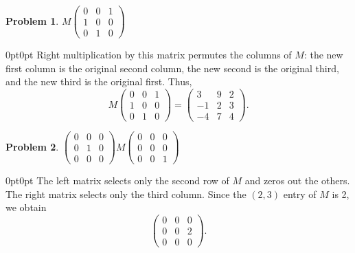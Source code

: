 \documentclass[12pt]{article}
\newenvironment{answer}
    {\begin{adjustwidth}{0pt}{0pt}}
    {\end{adjustwidth}}
\newtheorem{problem}{Problem}
\theoremstyle{remark}  %
\begin{document}
\begin{problem}
$
M
\begin{pmatrix}
0 & 0 & 1 \\
1 & 0 & 0 \\
0 & 1 & 0
\end{pmatrix}
$
\end{problem}
\begin{answer}
Right multiplication by this matrix permutes the columns of \(M\): the new first column is the original second column, the new second is the original third, and the new third is the original first. Thus,
\[
M \begin{pmatrix}
0 & 0 & 1 \\
1 & 0 & 0 \\
0 & 1 & 0
\end{pmatrix}
=
\begin{pmatrix}
3 & 9 & 2 \\
-1 & 2 & 3 \\
-4 & 7 & 4
\end{pmatrix}.
\]
\end{answer}

\begin{problem}
$
\begin{pmatrix}
0 & 0 & 0 \\
0 & 1 & 0 \\
0 & 0 & 0
\end{pmatrix}
M
\begin{pmatrix}
0 & 0 & 0 \\
0 & 0 & 0 \\
0 & 0 & 1
\end{pmatrix}
$
\end{problem}
\begin{answer}
The left matrix selects only the second row of \(M\) and zeros out the others. The right matrix selects only the third column. Since the \((2,3)\) entry of \(M\) is 2, we obtain
\[
\begin{pmatrix}
0 & 0 & 0 \\
0 & 0 & 2 \\
0 & 0 & 0
\end{pmatrix}.
\]
\end{answer}
\end{document}
